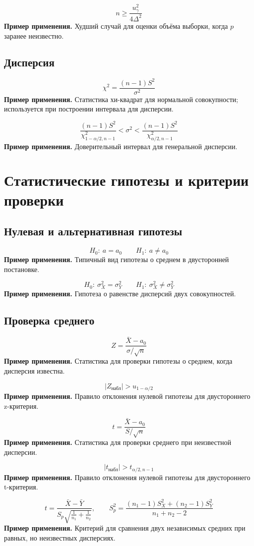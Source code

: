\documentclass[a4paper,14pt]{extarticle}
\newcommand{\FormulaNote}[2]{%
  \begin{equation*}
  #1
  \end{equation*}
  \noindent\textbf{Пример применения.} #2\par\medskip
}
\begin{document}
\FormulaNote{n\ge \frac{u_\gamma^2}{4\Delta^2}}{Худший случай для оценки объёма выборки, когда $p$ заранее неизвестно.}

\subsection{Дисперсия}

\FormulaNote{\chi^2=\frac{(n-1)S^2}{\sigma^2}}{Статистика хи-квадрат для нормальной совокупности; используется при построении интервала для дисперсии.}

\FormulaNote{\frac{(n-1)S^2}{\chi^2_{1-\alpha/2,n-1}}<\sigma^2<\frac{(n-1)S^2}{\chi^2_{\alpha/2,n-1}}}{Доверительный интервал для генеральной дисперсии.}

\section{Статистические гипотезы и критерии проверки}

\subsection{Нулевая и альтернативная гипотезы}

\FormulaNote{H_0:\ a=a_0 \qquad H_1:\ a\neq a_0}{Типичный вид гипотезы о среднем в двусторонней постановке.}

\FormulaNote{H_0:\ \sigma_X^2=\sigma_Y^2 \qquad H_1:\ \sigma_X^2\neq \sigma_Y^2}{Гипотеза о равенстве дисперсий двух совокупностей.}

\subsection{Проверка среднего}

\FormulaNote{Z=\frac{\bar{X}-a_0}{\sigma/\sqrt{n}}}{Статистика для проверки гипотезы о среднем, когда дисперсия известна.}

\FormulaNote{|Z_{\text{набл}}|>u_{1-\alpha/2}}{Правило отклонения нулевой гипотезы для двустороннего z-критерия.}

\FormulaNote{t=\frac{\bar{X}-a_0}{S/\sqrt{n}}}{Статистика для проверки среднего при неизвестной дисперсии.}

\FormulaNote{|t_{\text{набл}}|>t_{\alpha/2,n-1}}{Правило отклонения нулевой гипотезы для двустороннего t-критерия.}

\FormulaNote{
t=\frac{\bar{X}-\bar{Y}}{S_p\sqrt{\frac{1}{n_1}+\frac{1}{n_2}}},
\qquad
S_p^2=\frac{(n_1-1)S_X^2+(n_2-1)S_Y^2}{n_1+n_2-2}
}{Критерий для сравнения двух независимых средних при равных, но неизвестных дисперсиях.}
\end{document}
